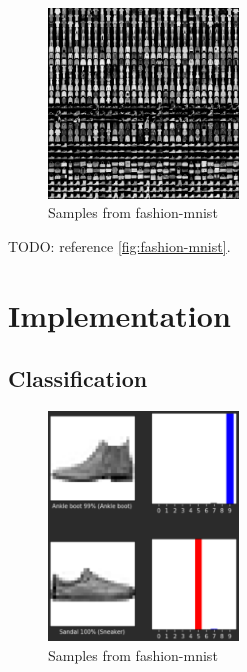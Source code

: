 \documentclass[conference]{IEEEtran}
\begin{document}
    \begin{figure}
        \caption{Samples from fashion-mnist}
        \label{fig:fashion-mnist}
        \begin{center}
            \includegraphics[width=0.45\textwidth]{data.png}
        \end{center}
    \end{figure}

    TODO: reference \autoref{fig:fashion-mnist}.

    \section{Implementation}\label{sec:implementation}

    \subsection{Classification}\label{subsec:implementation-classification}

    \begin{figure}
        \caption{Samples from fashion-mnist}
        \label{fig:classification}
        \begin{center}
            \includegraphics[width=0.45\textwidth]{classification.png}
        \end{center}
    \end{figure}
\end{document}
